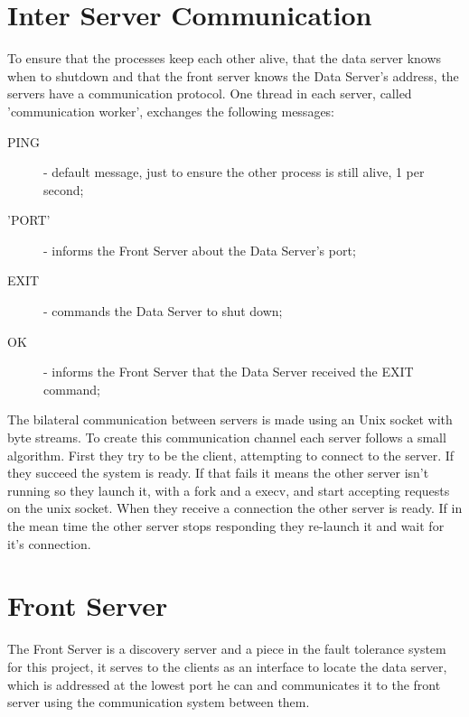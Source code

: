\documentclass[12pt]{article} %
\begin{document}

\section{Inter Server Communication}
\label{sec:CommunicationProtocol}
To ensure that the processes keep each other alive, that the data server knows when
to shutdown and  that the front server knows the Data Server's address, the servers
have a communication protocol. One thread in each server, called 'communication
worker', exchanges the following messages:
  \begin{description}
    \item[PING] - default message, just to ensure the other process is still alive, 1 per second;
    \item['PORT'] - informs the Front Server about the Data Server's port;
    \item[EXIT] - commands the Data Server to shut down;
    \item[OK] - informs the Front Server that the Data Server received the EXIT command;
  \end{description}

The bilateral communication between servers is made using an Unix socket with
byte streams. To create this communication channel each server follows a small
algorithm. First they try to be the client, attempting to connect to the server.
If they succeed the system is ready. If that fails it means the other server isn't
running so they launch it, with a fork and a execv, and start accepting requests
on the unix socket. When they receive a connection the other server is ready. If
in the mean time the other server stops responding they re-launch it and wait for
it's connection.

\section{Front Server}
\label{sec:FrontServer}

The Front Server is a discovery server and a piece in the fault tolerance system for this project,
it serves to the clients as an interface to locate the data server, which is addressed at the lowest port he can
and communicates it to the front server using the communication system between them.
\end{document}
